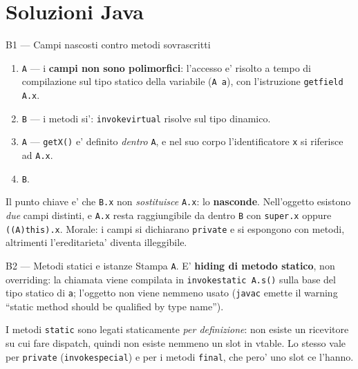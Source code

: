 \documentclass{report}
\newcommand{\code}[1]{\texttt{\small #1}}
\begin{document}
\section{Soluzioni Java}

\begin{soluzione}{B1 --- Campi nascosti contro metodi sovrascritti}
\label{sol:B1}
\begin{enumerate}
    \item[(1)] \code{A} --- i \textbf{campi non sono polimorfici}: l'accesso e'
          risolto a tempo di compilazione sul tipo statico della variabile
          (\code{A a}), con l'istruzione \code{getfield A.x}.
    \item[(2)] \code{B} --- i metodi si': \code{invokevirtual} risolve sul tipo
          dinamico.
    \item[(3)] \code{A} --- \code{getX()} e' definito \emph{dentro} \code{A}, e
          nel suo corpo l'identificatore \code{x} si riferisce ad \code{A.x}.
    \item[(4)] \code{B}.
\end{enumerate}
Il punto chiave e' che \code{B.x} non \emph{sostituisce} \code{A.x}: lo
\textbf{nasconde}. Nell'oggetto esistono \emph{due} campi distinti, e \code{A.x}
resta raggiungibile da dentro \code{B} con \code{super.x} oppure
\code{((A)this).x}. Morale: i campi si dichiarano \code{private} e si espongono
con metodi, altrimenti l'ereditarieta' diventa illeggibile.
\end{soluzione}

\begin{soluzione}{B2 --- Metodi statici e istanze}
\label{sol:B2}
Stampa \code{A}. E' \textbf{hiding di metodo statico}, non overriding: la
chiamata viene compilata in \code{invokestatic A.s()} sulla base del tipo
statico di \code{a}; l'oggetto non viene nemmeno usato (\code{javac} emette il
warning ``static method should be qualified by type name'').

I metodi \code{static} sono legati staticamente \emph{per definizione}: non
esiste un ricevitore su cui fare dispatch, quindi non esiste nemmeno un slot in
vtable. Lo stesso vale per \code{private} (\code{invokespecial}) e per i metodi
\code{final}, che pero' uno slot ce l'hanno.
\end{soluzione}
\end{document}
